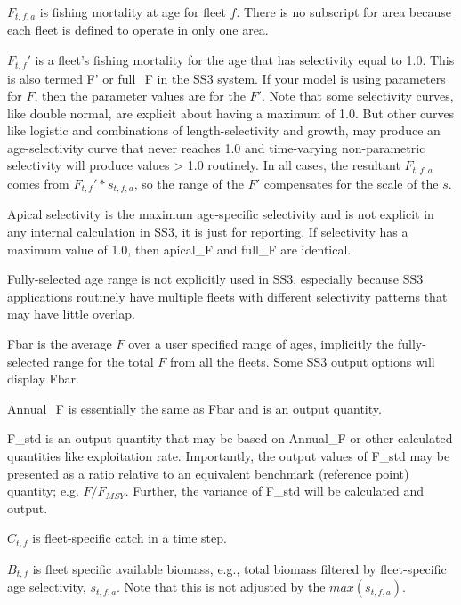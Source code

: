 $F_{t,f,a}$ is fishing mortality at age for fleet $f$. There is no subscript for area because each fleet is defined to operate in only one area.

$F_{t,f}'$ is a fleet's fishing mortality for the age that has selectivity equal to 1.0. This is also termed F' or full\_F in the SS3 system. If your model is using parameters for $F$, then the parameter values are for the $F'$. Note that some selectivity curves, like double normal, are explicit about having a maximum of 1.0. But other curves like logistic and combinations of length-selectivity and growth, may produce an age-selectivity curve that never reaches 1.0 and time-varying non-parametric selectivity will produce values > 1.0 routinely. In all cases, the resultant $F_{t,f,a}$ comes from $F_{t,f}' * s_{t,f,a}$, so the range of the $F'$ compensates for the scale of the $s$.

Apical selectivity is the maximum age-specific selectivity and is not explicit in any internal calculation in SS3, it is just for reporting. If selectivity has a maximum value of 1.0, then apical\_F and full_F are identical.

Fully-selected age range is not explicitly used in SS3, especially because SS3 applications routinely have multiple fleets with different selectivity patterns that may have little overlap.

Fbar is the average $F$ over a user specified range of ages, implicitly the fully-selected range for the total $F$ from all the fleets. Some SS3 output options will display Fbar.

Annual\_F is essentially the same as Fbar and is an output quantity.

F\_std is an output quantity that may be based on Annual\_F or other calculated quantities like exploitation rate. Importantly, the output values of F\_std may be presented as a ratio relative to an equivalent benchmark (reference point) quantity; e.g. $F / F_{MSY}$. Further, the variance of F\_std will be calculated and output.

$C_{t,f}$ is fleet-specific catch in a time step.

$B_{t,f}$ is fleet specific available biomass, e.g., total biomass filtered by fleet-specific age selectivity, $s_{t,f,a}$. Note that this is not adjusted by the $max(s_{t,f,a})$.


